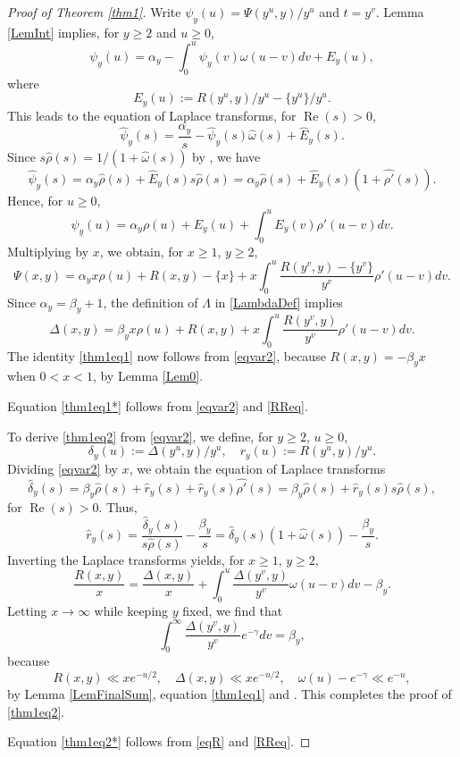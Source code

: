 \documentclass[11pt]{amsart}
\DeclareMathOperator{\re}{Re}
\begin{document}
\begin{proof}[Proof of Theorem \ref{thm1}]
Write $\psi_y(u)=\Psi(y^u,y)/y^u$ and $t=y^v$. Lemma \ref{LemInt} implies, for $y\ge 2$ and $u\ge 0$,
$$
\psi_y(u)=\alpha_y - \int_0^u \psi_y(v) \omega(u-v) dv+ E_y(u),
$$
where 
$$
E_y(u) := R(y^u,y)/y^u - \{y^u\}/y^u .
$$
This leads to the equation of Laplace transforms, for $\re(s)>0$,
$$
\widehat{\psi}_y(s)=\frac{\alpha_y}{s} - \widehat{\psi}_y(s) \widehat{\omega}(s) + \widehat{E}_y(s).
$$
Since $s\widehat{\rho}(s) = 1/(1+\widehat{\omega}(s))$ by \cite[Thm III.6.7]{Ten}, we have
$$
\widehat{\psi}_y(s)=\alpha_y \widehat{\rho}(s) + \widehat{E}_y(s) s\widehat{\rho}(s)=\alpha_y \widehat{\rho}(s) + \widehat{E}_y(s) (1+\widehat{\rho'}(s)).
$$
Hence, for $u\ge 0$,
$$
\psi_y(u) = \alpha_y \rho(u) +E_y(u)+ \int_0^u E_y(v) \rho'(u-v) dv.
$$
Multiplying by $x$, we obtain, for $x\ge 1$, $y\ge 2$,
$$
\Psi(x,y) = \alpha_y x \rho(u)+R(x,y) - \{x\} + x\int_0^u \frac{R(y^v,y) -\{y^v\} }{y^v} \rho'(u-v) dv .
$$
Since  $ \alpha_y=\beta_y +1$, the definition of $\Lambda$ in \eqref{LambdaDef} implies
\begin{equation}\label{eqvar2}
\Delta(x,y)= \beta_y x \rho(u) +R(x,y) + x \int_{0}^u \frac{R(y^v,y)}{ y^{v}} \rho'(u-v) dv.
\end{equation}
The identity \eqref{thm1eq1} now follows from \eqref{eqvar2},
because $R(x,y)=-\beta_y x$ when $0<x<1$, by Lemma \ref{Lem0}.

Equation \eqref{thm1eq1*} follows from \eqref{eqvar2} and \eqref{RReq}. 

To derive \eqref{thm1eq2} from \eqref{eqvar2}, we define, for $y\ge 2$, $u\ge 0$,
$$
\delta_y(u):=\Delta(y^u,y)/y^u, \quad r_y(u):=R(y^u,y)/y^u.
$$ 
Dividing \eqref{eqvar2} by $x$, 
we obtain the equation of Laplace transforms
$$
\widehat{\delta}_y(s)=\beta_y \widehat{\rho}(s)+\widehat{r}_y(s)+ \widehat{r}_y(s)\widehat{\rho'}(s)
=\beta_y \widehat{\rho}(s)+ \widehat{r}_y(s)s \widehat{\rho}(s),
$$
for $\re(s)>0$.
Thus,
$$
\widehat{r}_y(s)=\frac{\widehat{\delta}_y(s)}{s \widehat{\rho}(s)}- \frac{\beta_y}{s}=\widehat{\delta}_y(s)(1+\widehat{\omega}(s)) - \frac{\beta_y}{s}.
$$
Inverting the Laplace transforms yields, for $x\ge 1$, $y\ge 2$,
\begin{equation}\label{eqR}
\frac{R(x,y)}{x}= \frac{\Delta(x,y)}{x} +  \int_0^u \frac{\Delta(y^v,y)}{y^v} \omega(u-v) dv - \beta_y .
\end{equation}
Letting $x\to \infty$ while keeping $y$ fixed, we find that
\begin{equation*}\label{intbeta}
 \int_0^\infty \frac{\Delta(y^v,y)}{y^v} e^{-\gamma} dv = \beta_y,
\end{equation*}
because
$$
R(x,y)\ll x e^{-u/2},\quad  \Delta(x,y)\ll x e^{-u/2},\quad \omega(u)-e^{-\gamma} \ll e^{-u},
$$
by Lemma \ref{LemFinalSum}, equation \eqref{thm1eq1} and \cite[Cor. III.6.5]{Ten}. This completes the proof of \eqref{thm1eq2}.

Equation \eqref{thm1eq2*} follows from \eqref{eqR} and \eqref{RReq}. 
\end{proof}
\end{document}
